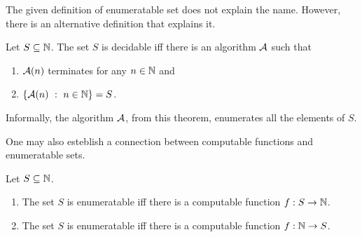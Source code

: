 The given definition of enumeratable set does not explain the name. However,
there is an alternative definition that explains it.
\begin{theorem}
  Let $S \subseteq \mathbb{N}$. The set $S$ is decidable iff there is an algorithm
  $\mathcal{A}$ such that
  \begin{enumerate}
    \item $\mathcal{A}(n)$ terminates for any $n \in \mathbb{N}$ and
    \item $\set[n \in  \N]{\Algorithm{A}(n)} = S$.
  \end{enumerate}
\end{theorem}
Informally, the algorithm $\mathcal{A}$, from this theorem, enumerates
all the elements of $S$.

One may also esteblish a connection between computable functions and
enumeratable sets.
\begin{theorem}
  Let $S \subseteq \mathbb{N}$.
  \begin{enumerate}
    \item The set $S$ is enumeratable iff there is a computable function
      $f : S \to \mathbb{N}$.
    \item The set $S$ is enumeratable iff there is a computable function
      $f : \mathbb{N} \to S$.
  \end{enumerate}
\end{theorem}

